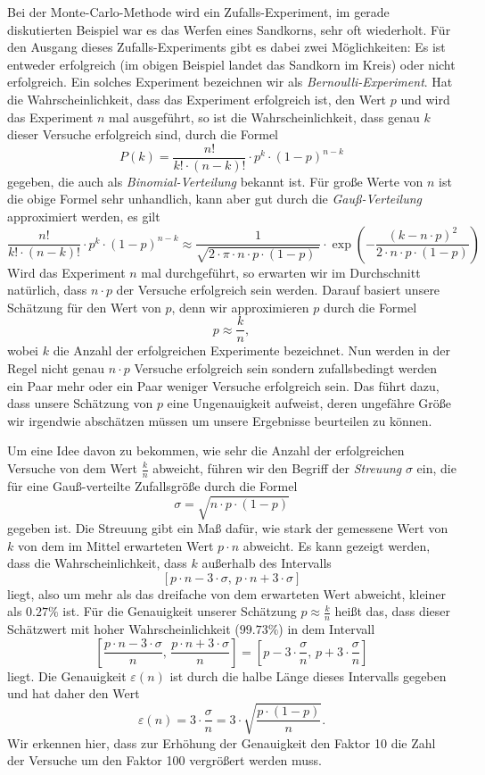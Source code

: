 Bei der Monte-Carlo-Methode wird ein Zufalls-Experiment, im gerade diskutierten Beispiel war es das Werfen
eines Sandkorns, sehr oft wiederholt.  F\"ur den Ausgang dieses Zufalls-Experiments gibt es dabei zwei
M\"oglichkeiten:  Es ist entweder erfolgreich (im obigen Beispiel landet das Sandkorn im Kreis) oder nicht
erfolgreich.  Ein solches Experiment bezeichnen wir als \emph{Bernoulli-Experiment}.
 Hat die Wahrscheinlichkeit, dass das Experiment erfolgreich ist, den Wert $p$ und wird das
Experiment $n$ mal ausgef\"uhrt, so ist die Wahrscheinlichkeit, dass genau $k$ dieser Versuche erfolgreich sind,
durch die Formel
\[ P(k) = \frac{n!}{k! \cdot (n-k)!} \cdot p^k \cdot (1-p)^{n-k} \]
gegeben, die auch als \emph{Binomial-Verteilung} bekannt ist.  F\"ur gro{\ss}e Werte von $n$ ist die obige Formel
sehr unhandlich, kann aber gut durch die \emph{Gau{\ss}-Verteilung} approximiert werden, es gilt
\[ \frac{n!}{k! \cdot (n-k)!} \cdot p^k \cdot (1-p)^{n-k} \approx  
   \frac{1}{\sqrt{2\cdot \pi \cdot n \cdot p \cdot (1-p)\;}} \cdot 
   \exp\left(-\frac{(k - n \cdot p)^2}{2 \cdot n \cdot p \cdot (1 - p)}\right)
\]
Wird das Experiment $n$ mal durchgef\"uhrt, so erwarten wir im Durchschnitt nat\"urlich, dass $n \cdot p$ der
Versuche erfolgreich sein werden.  Darauf basiert unsere Sch\"atzung f\"ur den Wert von $p$, denn wir approximieren
$p$ durch die Formel
\[ p \approx \frac{k}{n}, \]
wobei $k$ die Anzahl der erfolgreichen Experimente bezeichnet.  Nun werden in der Regel nicht genau $n \cdot p$
Versuche erfolgreich sein sondern zufallsbedingt werden ein Paar mehr oder ein Paar weniger Versuche
erfolgreich sein.  Das f\"uhrt dazu, dass unsere Sch\"atzung von $p$ eine Ungenauigkeit aufweist, deren ungef\"ahre
Gr\"o{\ss}e wir irgendwie absch\"atzen m\"ussen um unsere Ergebnisse beurteilen zu k\"onnen.

Um eine Idee davon zu bekommen, wie sehr die Anzahl der erfolgreichen Versuche von dem Wert $\frac{k}{n}$
abweicht,  f\"uhren wir den Begriff der \emph{Streuung} $\sigma$ ein, die f\"ur eine Gau{\ss}-verteilte Zufallsgr\"o{\ss}e
durch die Formel
\[ \sigma = \sqrt{n \cdot p \cdot (1 - p)} \]
gegeben ist.  Die Streuung gibt ein Ma{\ss} daf\"ur, wie stark der gemessene Wert von $k$ von dem im Mittel
erwarteten Wert $p \cdot n$ abweicht.  Es kann gezeigt werden, dass die Wahrscheinlichkeit, dass $k$ au{\ss}erhalb
des Intervalls
\[ [ p \cdot n - 3 \cdot \sigma,\, p \cdot n + 3 \cdot \sigma ] \]
liegt, also um mehr als das dreifache von dem erwarteten Wert abweicht, kleiner als $0.27 \%$ ist.  F\"ur
 die Genauigkeit unserer Sch\"atzung $p \approx \frac{k}{n}$ hei{\ss}t das, dass dieser Sch\"atzwert mit hoher
 Wahrscheinlichkeit ($99.73\%$) in dem Intervall
\[  \left[ \frac{p \cdot n - 3 \cdot \sigma}{n},\, \frac{p \cdot n + 3 \cdot \sigma}{n} \right] 
  = \left[ p - 3 \cdot \frac{\sigma}{n},\, p + 3 \cdot \frac{\sigma}{n} \right]
\] 
liegt.  Die Genauigkeit $\varepsilon(n)$ ist durch die halbe L\"ange dieses Intervalls gegeben und hat daher den
Wert 
\[ \varepsilon(n) = 3 \cdot \frac{\sigma}{n} = 3 \cdot \sqrt{\frac{p \cdot (1 - p)}{n}}. \]
Wir erkennen hier, dass zur Erh\"ohung der Genauigkeit den Faktor 10 die Zahl der Versuche um den Faktor 100
vergr\"o{\ss}ert werden muss.

